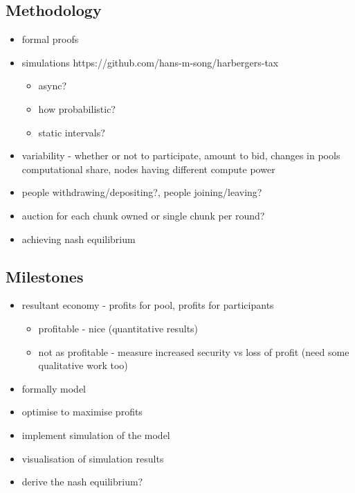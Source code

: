 \subsection{Methodology}

\begin{itemize}
  \item formal proofs
  \item simulations https://github.com/hans-m-song/harbergers-tax 
  \begin{itemize}
    \item async? 
    \item how probabilistic?
    \item static intervals?
  \end{itemize}
  \item variability - whether or not to participate, amount to bid, changes in pools computational share, nodes having different compute power
  \item people withdrawing/depositing?, people joining/leaving?
  \item auction for each chunk owned or single chunk per round?
  \item achieving nash equilibrium
\end{itemize}

\subsection{Milestones}

\begin{itemize}
  \item resultant economy - profits for pool, profits for participants
  \begin{itemize}
    \item profitable - nice (quantitative results)
    \item not as profitable - measure increased security vs loss of profit (need some qualitative work too)
  \end{itemize}
\end{itemize}

\begin{itemize}
  \item formally model
  \item optimise to maximise profits
  \item implement simulation of the model
  \item visualisation of simulation results
  \item derive the nash equilibrium?
\end{itemize} 

